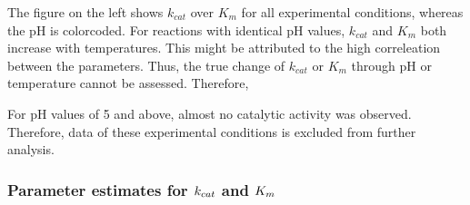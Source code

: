 \documentclass[letterpaper,10pt,english]{jupyterBook}
\begin{document}
\sphinxAtStartPar
The figure on the left shows \(k_{cat}\) over \(K_{m}\) for all experimental conditions, whereas the pH is color\sphinxhyphen{}coded. For reactions with identical pH values, \(k_{cat}\) and \(K_{m}\) both increase with temperatures. This might be attributed to the high correleation between the parameters. Thus, the true change of \(k_{cat}\) or \(K_{m}\) through pH or temperature cannot be assessed. Therefore,

\sphinxAtStartPar
For pH values of 5 and above, almost no catalytic activity was observed. Therefore, data of these experimental conditions is excluded from further analysis.


\subsubsection{Parameter estimates for \protect\(k_{cat}\protect\) and \protect\(K_{m}\protect\)}
\label{\detokenize{scenarios/SLAC_kinetic_characterization:parameter-estimates-for-k-cat-and-k-m}}
\end{document}
